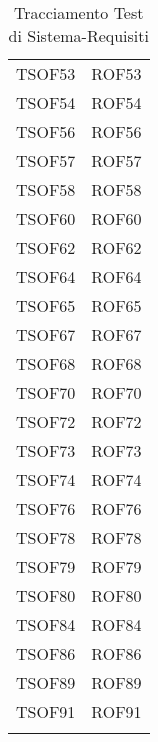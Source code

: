 \documentclass[../PianoDiQualifica.tex]{subfiles}
\begin{document}
\begin{longtable}[c] { >{\centering\arraybackslash}p{3cm} >{\centering\arraybackslash}p{3cm}}
			TSOF53 & ROF53 \\ 
			\addlinespace[0.3em]
			\midrule
			\addlinespace[0.3em]
			TSOF54 & ROF54 \\ 
			\addlinespace[0.3em]
			\midrule
			\addlinespace[0.3em]
			TSOF56 & ROF56 \\ 
			\addlinespace[0.3em]
			\midrule
			\addlinespace[0.3em]
			TSOF57 & ROF57 \\ 
			\addlinespace[0.3em]
			\midrule
			\addlinespace[0.3em]
			TSOF58 & ROF58 \\ 
			\addlinespace[0.3em]
			\midrule
			\addlinespace[0.3em]
			TSOF60 & ROF60 \\ 
			\addlinespace[0.3em]
			\midrule
			\addlinespace[0.3em]
			TSOF62 & ROF62 \\ 
			\addlinespace[0.3em]
			\midrule
			\addlinespace[0.3em]
			TSOF64 & ROF64 \\ 
			\addlinespace[0.3em]
			\midrule
			\addlinespace[0.3em]
			TSOF65 & ROF65 \\ 
			\addlinespace[0.3em]
			\midrule
			\addlinespace[0.3em]
			TSOF67 & ROF67 \\ 
			\addlinespace[0.3em]
			\midrule
			\addlinespace[0.3em]
			TSOF68 & ROF68 \\ 
			\addlinespace[0.3em]
			\midrule
			\addlinespace[0.3em]
			TSOF70 & ROF70 \\
			\addlinespace[0.3em]
			\midrule
			\addlinespace[0.3em] 
			TSOF72 & ROF72 \\ 
			\addlinespace[0.3em]
			\midrule
			\addlinespace[0.3em]
			TSOF73 & ROF73 \\ 
			\addlinespace[0.3em]
			\midrule
			\addlinespace[0.3em]
			TSOF74 & ROF74 \\ 
			\addlinespace[0.3em]
			\midrule
			\addlinespace[0.3em]
			TSOF76 & ROF76 \\ 
			\addlinespace[0.3em]
			\midrule
			\addlinespace[0.3em]
			TSOF78 & ROF78 \\ 
			\addlinespace[0.3em]
			\midrule
			\addlinespace[0.3em]
			TSOF79 & ROF79 \\ 
			\addlinespace[0.3em]
			\midrule
			\addlinespace[0.3em]
			TSOF80 & ROF80 \\ 
			\addlinespace[0.3em]
			\midrule
			\addlinespace[0.3em]	
			TSOF84 & ROF84\\ 
			\addlinespace[0.3em]
			\midrule
			\addlinespace[0.3em]
			TSOF86 & ROF86 \\ 
			\addlinespace[0.3em]
			\midrule
			\addlinespace[0.3em]
			TSOF89 & ROF89\\ 
			\addlinespace[0.3em]
			\midrule
			\addlinespace[0.3em]
			TSOF91 & ROF91 \\ 
			\bottomrule
			\caption{Tracciamento Test di Sistema-Requisiti}
	\end{longtable}
\end{document}
